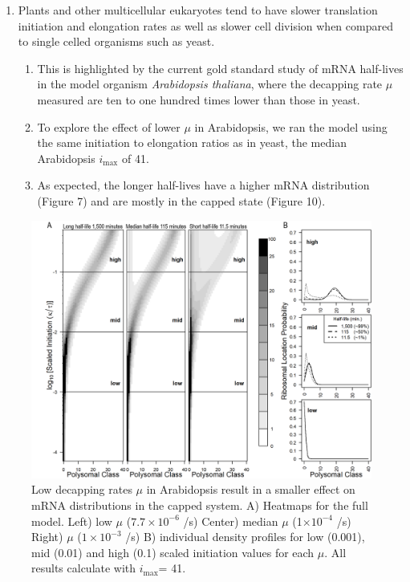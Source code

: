 \documentclass[review]{elsarticle}
\newcommand{\imax}{\ensuremath{{i_{\max}}}\xspace}
\begin{document}
\begin{enumerate}
\item Plants and other multicellular eukaryotes tend to have slower translation initiation and elongation rates as well as slower cell division when compared to single celled organisms such as yeast.
\begin{enumerate}
  \item This is highlighted by the current gold standard study of mRNA half-lives in the model organism \textit{Arabidopsis thaliana}, where the decapping rate $\mu$ measured are ten to one hundred times lower than those in yeast. 
  \item To explore the effect of lower $\mu$ in Arabidopsis, we ran the model using the same initiation to elongation ratios as in yeast, the median Arabidopsis \imax of 41. 
  \item As expected, the longer half-lives have a higher mRNA distribution (Figure 7) and are mostly in the capped state (Figure 10).
\end{enumerate}
\end{enumerate}

\begin{figure}[!ht]
\centering
\includegraphics[width=120mm]{Images/2023-07-09_Figure2_At_Marking_Rate_range_medianlength_with_labels.png}
\caption{Low decapping rates $\mu$ in Arabidopsis result in a smaller effect on mRNA distributions in the capped system.  A)  Heatmaps for the full model. Left) low $\mu$ ($7.7\times 10^{-6}$ /s) Center) median $\mu$ (1$\times 10^{-4}$ /s) Right) $\mu$ ($1\times 10^{-3}$ /s) B) individual density profiles for low (0.001), mid (0.01) and high (0.1) scaled initiation values for each $\mu$. All results calculate with \imax = 41.}
\end{figure}
\clearpage
\end{document}
